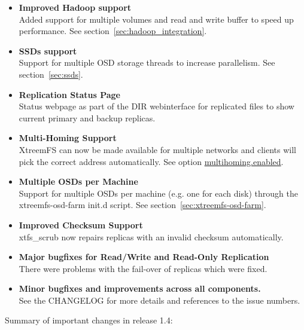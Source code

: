 \documentclass[a4paper,10pt]{book}
\begin{document}
\begin{itemize}
 \item \textbf{Improved Hadoop support}\\
    Added support for multiple volumes and read and write buffer to speed up performance. See section~\ref{sec:hadoop_integration}.
 \item \textbf{SSDs support}\\
    Support for multiple OSD storage threads to increase parallelism. See section~\ref{sec:ssds}.
 \item \textbf{Replication Status Page}\\
    Status webpage as part of the DIR webinterface for replicated files to show current primary and backup replicas.
 \item \textbf{Multi-Homing Support}\\
    XtreemFS can now be made available for multiple networks and clients will pick the correct address automatically. See option \hyperref[option:multihoming.enabled]{multihoming.enabled}.
 \item \textbf{Multiple OSDs per Machine}\\
    Support for multiple OSDs per machine (e.g. one for each disk) through the xtreemfs-osd-farm init.d script. See section~\ref{sec:xtreemfs-osd-farm}.
 \item \textbf{Improved Checksum Support}\\
    xtfs\_scrub now repairs replicas with an invalid checksum automatically.
 \item \textbf{Major bugfixes for Read/Write and Read-Only Replication}\\
    There were problems with the fail-over of replicas which were fixed.
 \item \textbf{Minor bugfixes and improvements across all components.}\\
    See the CHANGELOG for more details and references to the issue numbers.
\end{itemize}

Summary of important changes in release 1.4:
\end{document}
